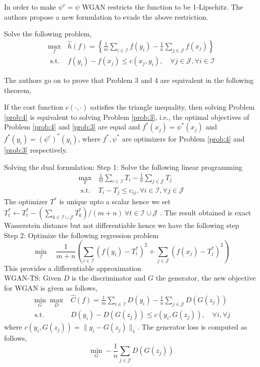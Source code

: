 In order to make $\psi^c = \psi$ WGAN restricts the function to be 1-Lipschitz. The authors propose a new formulation to evade the above restriction.
\begin{prob}
\label{prob:4}
Solve the following problem,
$$
\begin{array}{ll}{\max _{f}} & {\hat{h}(f)=\left\{\frac{1}{m} \sum_{i \in \mathcal{I}} f\left(y_{i}\right)-\frac{1}{n} \sum_{j \in \mathcal{J}} f\left(x_{j}\right)\right\}} \\ {\text { s.t. }} & {f\left(y_{i}\right)-f\left(x_{j}\right) \leq c\left(x_{j}, y_{i}\right), \quad \forall j \in \mathcal{J}, \forall i \in \mathcal{I}}\end{array}
$$
\end{prob}{}
The authors go on to prove that Problem 3 and 4 are equivalent in the following theorem,
\begin{theorem}
If the cost function $c(·,·)$ satisfies the triangle inequality, then solving Problem \ref{prob:4} is equivalent to solving Problem \ref{prob:3}, i.e., the optimal objectives of Problem \ref{prob:4} and \ref{prob:3} are equal and $f^*(x_j) = \psi^*(x_j)$ and $f^*(y_i) = (\psi^c)^* (y_i)$, where $f^*, \psi^*$ are optimizers for Problem \ref{prob:4} and \ref{prob:3} respectively. 
\end{theorem}{}
Solving the dual formulation:
Step 1: Solve the following linear programming
$$
\begin{array}{cl}{\max _{T}} & {\frac{1}{m} \sum_{i \in \mathcal{I}} T_{i}-\frac{1}{n} \sum_{j \in \mathcal{J}} T_{j}} \\ {\text { s.t. }} & {T_{i}-T_{j} \leq c_{i j}, \forall i \in \mathcal{I}, \forall j \in \mathcal{J}}\end{array}
$$
The optimizer $T^*$ is unique upto a scalar hence we set $
 T_{t}^{*} \leftarrow T_{t}^{*}-\left(\sum_{k \in \mathcal{I} \cup \mathcal{J}} T_{k}^{*}\right) /(m+n) \  \forall t \in \mathcal{I} \cup \mathcal{J} $ .
The result obtained is exact Wasserstein distance but not differentiable hence we have the following step\\
Step 2: Optimize the following regression problem
$$
\min _{f} \quad \frac{1}{m+n}\left(\sum_{i \in \mathcal{I}}\left(f\left(y_{i}\right)-T_{i}^{*}\right)^{2}+\sum_{j \in \mathcal{J}}\left(f\left(x_{j}\right)-T_{j}^{*}\right)^{2}\right)
$$
This provides a differentiable approximation \\
WGAN-TS: Given $D$ is the discriminator and $G$ the generator, the new objective for WGAN is given as follows,
$$
\begin{array}{ll}{\min _{G} \max _{D}} & {\hat{C}(f)= \frac{1}{m} \sum_{i \in \mathcal{I}} D(y_{i})- \frac{1}{n} \sum_{j \in \mathcal{J}} D(G(z_{j}))} \\ 
{\text { s.t. }} &
{D\left(y_{i}\right)-D\left(G\left(z_{j}\right)\right) \leq c\left(y_{i}, G\left(z_{j}\right)\right), \quad \forall i, \forall j}\end{array} 
$$
where $c(y_i, G(z_j)) = \parallel y_i - G(z_j)\parallel_1$. The generator loss is computed as follows,
$$
\min _{G}-\frac{1}{n} \sum_{j \in \mathcal{J}} D\left(G\left(z_{j}\right)\right)$$


